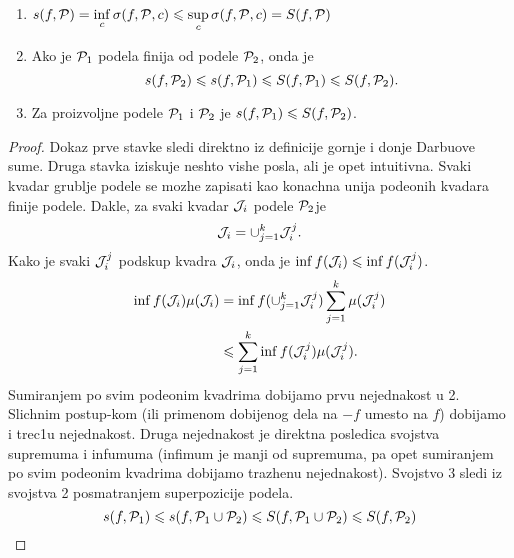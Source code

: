 \documentclass[../main.tex]{subfiles}
\begin{document}
    \begin{lem}
	\begin{enumerate}
	    \item $\displaystyle{s(f,\mathcal{P}) = \inf_c \sigma(f,\mathcal{P},c) \leqslant\sup_c \sigma(f,\mathcal{P},c) = S(f,\mathcal{P})}$
	    \item Ako je $\mathcal{P}_1$ podela finija od podele $\mathcal{P}_2$, onda je 
	    	\[s(f,\mathcal{P}_2) \leqslant s(f,\mathcal{P}_1) \leqslant S(f,\mathcal{P}_1) \leqslant S(f,\mathcal{P}_2).\] 
	    \item Za proizvoljne podele $\mathcal{P}_1$ i $\mathcal{P}_2$ je $s(f,\mathcal{P}_1) \leqslant S(f,\mathcal{P}_2)$. 
	\end{enumerate}
    \end{lem}

    \begin{proof}
    	Dokaz prve stavke sledi direktno iz definicije gornje i donje Darbuove sume. Druga stavka iziskuje neshto vishe posla, ali je opet intuitivna.
	Svaki kvadar grublje podele se mozhe zapisati kao konachna unija podeonih kvadara finije podele. Dakle, za svaki kvadar $\mathcal{J}_i$ podele $\mathcal{P}_2$je 
	\[\mathcal{J}_i = \cup_{j=1}^k \mathcal{J}_i^j.\] Kako je svaki $\mathcal{J}_i^j$ podskup kvadra $\mathcal{J}_i$, onda  je $\inf f(\mathcal{J}_i) \leqslant \inf f(\mathcal{J}_i^j)$.
	\begin{align*}
	    \inf f(\mathcal{J}_i)\mu(\mathcal{J}_i) &= \inf f(\displaystyle{\cup_{j=1}^k \mathcal{J}_i^j})\sum_{j=1}^k\mu(\mathcal{J}_i^j)\\
	    &\leqslant \sum_{j=1}^k \inf f(\mathcal{J}_i^j)\mu(\mathcal{J}_i^j). 
	\end{align*}
	Sumiranjem po svim podeonim kvadrima dobijamo prvu nejednakost u 2. Slichnim postup-kom (ili primenom dobijenog dela na $-f$ umesto na $f$) dobijamo i trec1u nejednakost.
	Druga nejednakost je direktna posledica svojstva supremuma i infumuma (infimum je manji od supremuma, pa opet sumiranjem po svim podeonim kvadrima dobijamo trazhenu nejednakost).
	Svojstvo 3 sledi iz svojstva 2 posmatranjem superpozicije podela.
	\[s(f,\mathcal{P}_1) \leqslant s(f,\mathcal{P}_1 \cup \mathcal{P}_2)\leqslant S(f,\mathcal{P}_1\cup \mathcal{P}_2)\leqslant S(f,\mathcal{P}_2)\]
    \end{proof}
\end{document}
